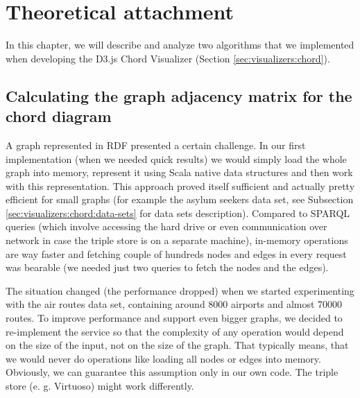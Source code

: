 \chapter{Theoretical attachment}

In this chapter, we will describe and analyze two algorithms that we implemented when developing the D3.js Chord Visualizer (Section \ref{sec:visualizers:chord}).

\section{Calculating the graph adjacency matrix for the chord diagram}

A graph represented in RDF presented a certain challenge. In our first implementation (when we needed quick results) we would simply load the whole graph into memory, represent it using Scala native data structures and then work with this representation. This approach proved itself sufficient and actually pretty efficient for small graphs (for example the asylum seekers data set, see Subsection \ref{sec:visualizers:chord:data-sets} for data sets description). Compared to SPARQL queries (which involve accessing the hard drive or even communication over network in case the triple store is on a separate machine), in-memory operations are way faster and fetching couple of hundreds nodes and edges in every request was bearable (we needed just two queries to fetch the nodes and the edges).
%
%
%

The situation changed (the performance dropped) when we started experimenting with the air routes data set, containing around 8000 airports and almost 70000 routes. To improve performance and support even bigger graphs, we decided to re-implement the service so that the complexity of any operation would depend on the size of the input, not on the size of the graph. That typically means, that we would never do operations like loading all nodes or edges into memory. Obviously, we can guarantee this assumption only in our own code. The triple store (e. g. Virtuoso) might work differently.

